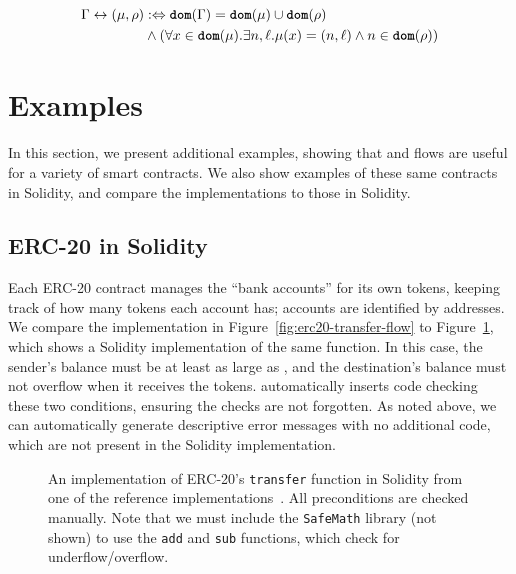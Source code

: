 \documentclass[nonacm, dvipsnames, sigconf]{acmart}
\begin{document}
\begin{align*}
    \Gamma \leftrightarrow (\mu, \rho) &:\Leftrightarrow \textbf{\texttt{dom}}(\Gamma) = \textbf{\texttt{dom}}(\mu) \cup \textbf{\texttt{dom}}(\rho) \\
                               &\land (\forall x \in \textbf{\texttt{dom}}(\mu). \exists n,\ell. \mu(x) = (n,\ell) \land n \in \textbf{\texttt{dom}}(\rho))
\end{align*}


\section{Examples}

In this section, we present additional examples, showing that \langName and flows are useful for a variety of smart contracts.
We also show examples of these same contracts in Solidity, and compare the \langName implementations to those in Solidity.

\subsection{ERC-20 in Solidity}\label{sec:erc20-impl}
Each ERC-20 contract manages the ``bank accounts'' for its own tokens, keeping track of how many tokens each account has; accounts are identified by addresses.
We compare the \langName implementation in Figure~\ref{fig:erc20-transfer-flow} to Figure~\ref{fig:erc20-transfer-sol}, which shows a Solidity implementation of the same function.
In this case, the sender's balance must be at least as large as , and the destination's balance must not overflow when it receives the tokens.
\langName automatically inserts code checking these two conditions, ensuring the checks are not forgotten.
As noted above, we can automatically generate descriptive error messages with no additional code, which are not present in the Solidity implementation.
\begin{figure}
    \centering
    
    \caption{An implementation of ERC-20's \lstinline[language=Solidity]{transfer} function in Solidity from one of the reference implementations~\cite{erc20Consensys}.
        All preconditions are checked manually.
        Note that we must include the \lstinline[language=Solidity]{SafeMath} library (not shown) to use the \lstinline[language=Solidity]{add} and \lstinline[language=Solidity]{sub} functions, which check for underflow/overflow.}
    \label{fig:erc20-transfer-sol}
\end{figure}
\end{document}
